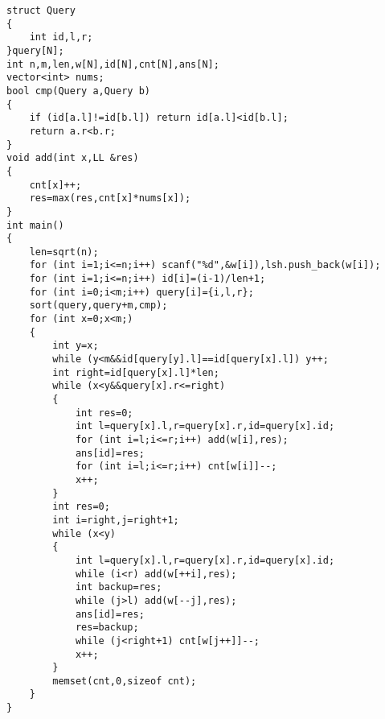 \documentclass[a4paper]{ctexart}
\begin{document}
\begin{lstlisting}
struct Query
{
    int id,l,r;
}query[N];
int n,m,len,w[N],id[N],cnt[N],ans[N];
vector<int> nums;
bool cmp(Query a,Query b)
{
    if (id[a.l]!=id[b.l]) return id[a.l]<id[b.l];
    return a.r<b.r;
}
void add(int x,LL &res)
{
    cnt[x]++;
    res=max(res,cnt[x]*nums[x]);
}
int main()
{
    len=sqrt(n);
    for (int i=1;i<=n;i++) scanf("%d",&w[i]),lsh.push_back(w[i]);
    for (int i=1;i<=n;i++) id[i]=(i-1)/len+1;
    for (int i=0;i<m;i++) query[i]={i,l,r};
    sort(query,query+m,cmp);
    for (int x=0;x<m;)
    {
        int y=x;
        while (y<m&&id[query[y].l]==id[query[x].l]) y++;
        int right=id[query[x].l]*len;
        while (x<y&&query[x].r<=right)
        {
            int res=0;
            int l=query[x].l,r=query[x].r,id=query[x].id;
            for (int i=l;i<=r;i++) add(w[i],res);
            ans[id]=res;
            for (int i=l;i<=r;i++) cnt[w[i]]--;
            x++;
        }
        int res=0;
        int i=right,j=right+1;
        while (x<y)
        {
            int l=query[x].l,r=query[x].r,id=query[x].id;
            while (i<r) add(w[++i],res);
            int backup=res;
            while (j>l) add(w[--j],res);
            ans[id]=res;
            res=backup;
            while (j<right+1) cnt[w[j++]]--;
            x++;
        }
        memset(cnt,0,sizeof cnt);
    }
}
\end{lstlisting}
\end{document}
